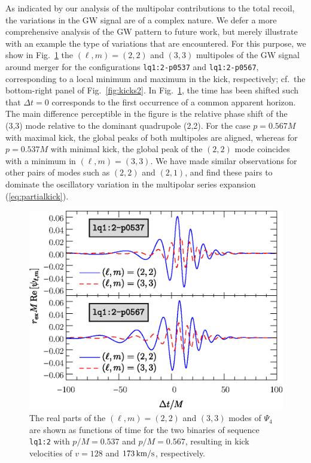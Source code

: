 \documentclass[floats,floatfix,showpacs,amssymb,physrev,twocolumn,superscriptaddress,reprint,
nofootinbib, longbibliography]{revtex4-2}
\newcounter{count}
\begin{document}
As indicated by our analysis of the multipolar contributions
to the total recoil, the variations in the GW signal are of a
complex nature. We defer a more comprehensive analysis of
the GW pattern to future work, but merely illustrate with an 
example the type of variations that are encountered.
For this purpose, we show in Fig.~\ref{fig:psi4modes}
the $(\ell,m)=(2,2)$ and $(3,3)$ multipoles of the
GW signal around merger for the configurations \texttt{lq1:2-p0537} 
and \texttt{lq1:2-p0567}, corresponding to a local minimum and 
maximum in the
kick, respectively; cf.~the bottom-right panel of Fig.~\ref{fig:kicks2}. In Fig.~\ref{fig:psi4modes},
the time has been shifted such that $\Delta t =0$ corresponds
to the first occurrence of a common apparent horizon. The main
difference perceptible in the figure is the relative phase shift of
the (3,3) mode relative to the dominant quadrupole (2,2). For the
case $p=0.567M$ with maximal kick, the global peaks of both multipoles
are aligned, whereas for $p=0.537M$ with minimal kick, the global peak
of the $(2,2)$ mode coincides with a minimum in $(\ell,m)=(3,3)$. We
have made similar observations for other pairs of modes such as
$(2,2)$ and $(2,1)$, and find these pairs to dominate the oscillatory
variation in the multipolar series expansion (\ref{eq:partialkick}).
%
\begin{figure}[t]
    \centering
    \includegraphics[width=\columnwidth,clip=true]{mode-kick-extrema.eps}    
    \caption{The real parts of the $(\ell,m)=(2,2)$ and $(3,3)$ modes of $\Psi_4$
             are shown as functions of time for the two binaries
             of sequence \texttt{lq1:2} with $p/M=0.537$ and $p/M=0.567$,
             resulting in kick velocities of $v = 128$
             and $173\,{\rm km/s}$, respectively.
            }
             \label{fig:psi4modes}
\end{figure}
%
\end{document}
